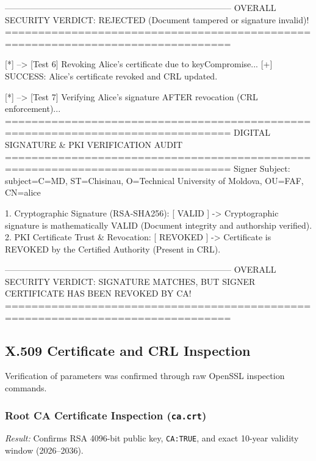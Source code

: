 \documentclass[12pt,a4paper]{article}
\begin{document}
\begin{terminalwindow}
--------------------------------------------------------------------------------
OVERALL SECURITY VERDICT: REJECTED (Document tampered or signature invalid)!
================================================================================

[*] --> [Test 6] Revoking Alice's certificate due to keyCompromise...
[+] SUCCESS: Alice's certificate revoked and CRL updated.

[*] --> [Test 7] Verifying Alice's signature AFTER revocation (CRL enforcement)...
================================================================================
  DIGITAL SIGNATURE & PKI VERIFICATION AUDIT
================================================================================
Signer Subject:  subject=C=MD, ST=Chisinau, O=Technical University of Moldova, OU=FAF, CN=alice

1. Cryptographic Signature (RSA-SHA256): [ VALID ]
   -> Cryptographic signature is mathematically VALID (Document integrity and authorship verified).
2. PKI Certificate Trust & Revocation: [ REVOKED ]
   -> Certificate is REVOKED by the Certified Authority (Present in CRL).

--------------------------------------------------------------------------------
OVERALL SECURITY VERDICT: SIGNATURE MATCHES, BUT SIGNER CERTIFICATE HAS BEEN REVOKED BY CA!
================================================================================
\end{terminalwindow}

\subsection{X.509 Certificate and CRL Inspection}
Verification of parameters was confirmed through raw OpenSSL inspection commands.

\subsubsection{Root CA Certificate Inspection (\texttt{ca.crt})}
\textit{Result:} Confirms RSA 4096-bit public key, \texttt{CA:TRUE}, and exact 10-year validity window (2026--2036).
\end{document}
